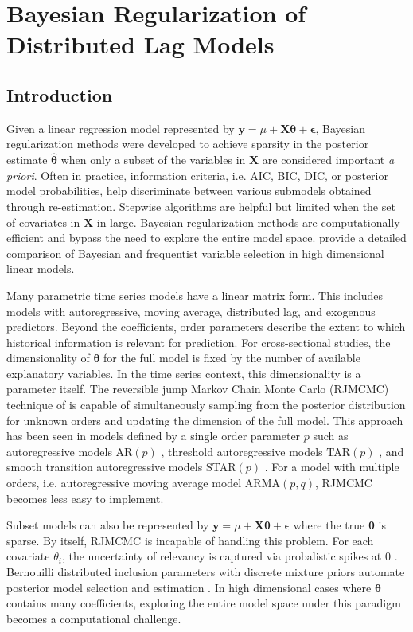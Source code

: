 \chapter{Bayesian Regularization of Distributed Lag Models}
\label{appendix3}
\newpage

\section{Introduction}
Given a linear regression model represented by $\bm{y}=\mu+\bm{X}\bm{\theta}+\bm{\epsilon}$,  Bayesian regularization methods were developed to achieve sparsity in the posterior estimate $\hat{\bm{\theta}}$ when only a subset of the variables in $\bm{X}$ are considered important \textit{a priori}. Often in practice, information criteria, i.e. AIC, BIC, DIC, or posterior model probabilities, help discriminate between various submodels obtained through re-estimation. Stepwise algorithms are helpful but limited when the set of covariates in $\bm{X}$ in large. Bayesian regularization methods are computationally efficient and bypass the need to explore the entire model space. \cite{Mallick2013} provide a detailed comparison of Bayesian and frequentist variable selection in high dimensional linear models.

Many parametric time series models have a linear matrix form. This includes models with autoregressive, moving average, distributed lag, and exogenous predictors. Beyond the coefficients, order parameters describe the extent to which historical information is relevant for prediction. For cross-sectional studies, the dimensionality of $\bm{\theta}$ for the full model is fixed by the number of available explanatory variables. In the time series context, this dimensionality is a parameter itself. The reversible jump Markov Chain Monte Carlo (RJMCMC) technique of \cite{Green1995} is capable of simultaneously sampling from the posterior distribution for unknown orders and updating the dimension of the full model. This approach has been seen in models defined by a single order parameter $p$ such as autoregressive models AR$(p)$ \citep{Troughton1997,Vermaak2004}, threshold autoregressive models TAR$(p)$ \citep{Campbell2004}, and smooth transition autoregressive models STAR$(p)$ \citep{Lopes2006}. For a model with multiple orders, i.e. autoregressive moving average model ARMA$(p,q)$, RJMCMC becomes less easy to implement.

Subset models can also be represented by $\bm{y}=\mu+\bm{X}\bm{\theta}+\bm{\epsilon}$ where the true $\bm{\theta}$ is sparse. By itself, RJMCMC is incapable of handling this problem. For each covariate $\theta_i$, the uncertainty of relevancy is captured via probalistic spikes at 0 \citep{Mitchell1988}. Bernouilli distributed inclusion parameters with discrete mixture priors automate posterior model selection and estimation \citep{George1993,Carlin1995,Kuo1998,Dellaportas2002}. In high dimensional cases where $\bm{\theta}$ contains many coefficients, exploring the entire model space under this paradigm becomes a computational challenge.

